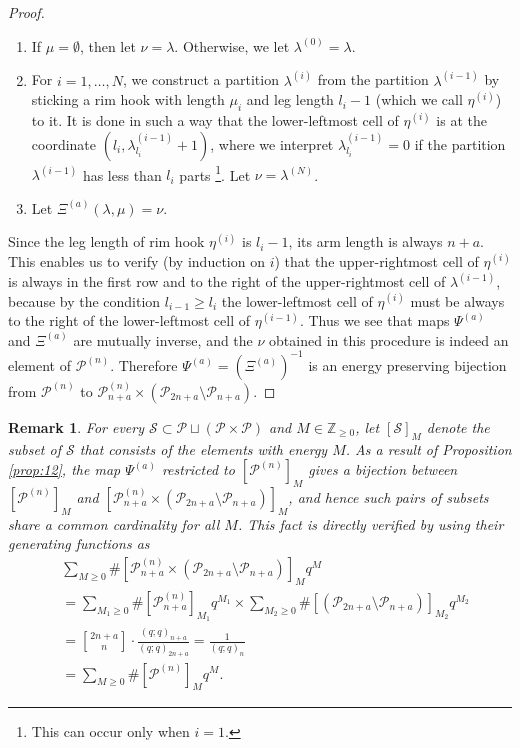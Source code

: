 \documentclass[sn-mathphys-num]{sn-jnl}%
\theoremstyle{thmstyleone}%
\theoremstyle{thmstyletwo}%
\newtheorem{remark}{Remark}%
\theoremstyle{thmstylethree}%
\begin{document}
\begin{proof}
\begin{enumerate}
\item If $\mu = \emptyset$, then let $\nu = \lambda$.
Otherwise, we let $\lambda^{(0)} = \lambda$.
\item For $i=1, \dots, N$, we construct a partition $\lambda^{(i)}$ from the partition $\lambda^{(i-1)}$
by sticking a rim hook with length $\mu_i$ and leg length $l_i-1$
(which we call $\eta^{(i)}$) to it.
It is done in such a way that
the lower-leftmost cell of $\eta^{(i)}$ is at the coordinate $(l_i, \lambda^{(i-1)}_{l_i}+1)$, where
we interpret $\lambda^{(i-1)}_{l_i} =0$ if the partition $\lambda^{(i-1)}$ has
less than $l_i$ parts \footnote{This can occur only when $i=1$.}. Let $\nu = \lambda^{(N)}$.
\item Let $\Xi^{(a)} (\lambda, \mu) = \nu$.
\end{enumerate}
Since the leg length of rim hook $\eta^{(i)}$ is $l_i -1$, its arm length is always $n+a$.
This enables us to verify (by induction on $i$) that the upper-rightmost cell of $\eta^{(i)}$ is always in the first row
and to the right of the upper-rightmost cell of $\lambda^{(i-1)}$,
because  by the condition $l_{i-1} \geq l_i$ the lower-leftmost cell of $\eta^{(i)}$ must be always
to the right of the lower-leftmost cell of $\eta^{(i-1)}$.
Thus we see that maps $\Psi^{(a)}$ and $\Xi^{(a)}$ are mutually inverse, and
the $\nu$ obtained in this procedure is indeed an element of $\mathscr{P}^{(n)}$.
Therefore $\Psi^{(a)} = (\Xi^{(a)})^{-1}$ is
an energy preserving bijection from
 $\mathscr{P}^{(n)}$ to $\mathscr{P}^{(n)}_{n+a} \times 
(\mathscr{P}_{2n+a} \setminus \mathscr{P}_{n+a}) $.
\end{proof}



\begin{remark}
For every $\mathscr{S} \subset \mathscr{P} \sqcup (\mathscr{P} \times \mathscr{P})$ and $M \in \mathbb{Z}_{\geq 0}$, 
let $[\mathscr{S}]_M$ denote the subset of $\mathscr{S}$ that consists of
the elements with energy $M$.
As a result of Proposition \ref{prop:12}, 
the map $\Psi^{(a)}$ restricted to $[\mathscr{P}^{(n)} ]_M$ gives a bijection between
$[\mathscr{P}^{(n)} ]_M$ and $[\mathscr{P}^{(n)}_{n+a} \times 
(\mathscr{P}_{2n+a} \setminus \mathscr{P}_{n+a}) ]_M$, and hence
such pairs of subsets share a common cardinality for all $M$.
This fact is directly verified by using their generating functions as
\begin{align*}
&\sum_{M \geq 0} \# [\mathscr{P}^{(n)}_{n+a} \times 
(\mathscr{P}_{2n+a} \setminus \mathscr{P}_{n+a})]_M  q^M \\
&=
\sum_{M_1 \geq 0} \# [\mathscr{P}^{(n)}_{n+a} ]_{M_1}  q^{M_1}
 \times
\sum_{M_2 \geq 0} \# [(\mathscr{P}_{2n+a} \setminus \mathscr{P}_{n+a})  ]_{M_2}   q^{M_2}
\\
&={ 2n+a \brack n} \cdot \frac{(q;q)_{n+a}}{(q;q)_{2n+a}} =\frac{1}{(q;q)_n} \\
&= \sum_{M \geq 0} \# [\mathscr{P}^{(n)} ]_M   q^M.
\end{align*}
\end{remark}
\end{document}
